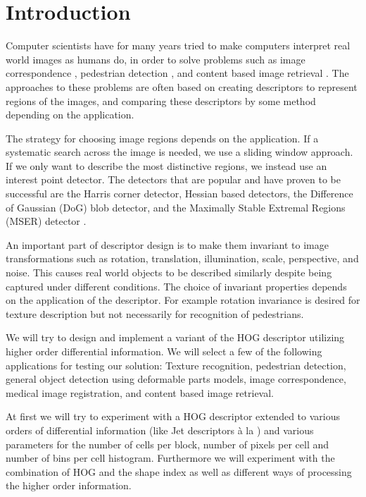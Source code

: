 \documentclass[thesis.tex]{subfiles}
\begin{document}
\section{Introduction}
\label{sec:introduction}

Computer scientists have for many years tried to make computers interpret real world images as humans do, in order to solve problems such as image correspondence \cite{dahl2011finding}, pedestrian detection \cite{felzenszwalb2008discriminatively}, and content based image retrieval \cite{smeulders2000content}. The approaches to these problems are often based on creating descriptors to represent regions of the images, and comparing these descriptors by some method depending on the application. 

The strategy for choosing image regions depends on the application. If a systematic search across the image is needed, we use a sliding window approach. If we only want to describe the most distinctive regions, we instead use an interest point detector. The detectors that are popular and have proven to be successful are the Harris corner detector, Hessian based detectors, the Difference of Gaussian (DoG) blob detector, and the Maximally Stable Extremal Regions (MSER) detector \cite{aanaes2012interesting,dahl2011finding}.

An important part of descriptor design is to make them invariant to image transformations such as rotation, translation, illumination, scale, perspective, and noise. This causes real world objects to be described similarly despite being captured under different conditions. The choice of invariant properties depends on the application of the descriptor. For example rotation invariance is desired for texture description but not necessarily for recognition of pedestrians.

We will try to design and implement a variant of the HOG descriptor utilizing higher order differential information. We will select a few of the following applications for testing our solution: Texture recognition, pedestrian detection, general object detection using deformable parts models, image correspondence, medical image registration, and content based image retrieval.

At first we will try to experiment with a HOG descriptor extended to various orders of differential information (like Jet descriptors à la \cite{larsen2012jet}) and various parameters for the number of cells per block, number of pixels per cell and number of bins per cell histogram. Furthermore we will experiment with the combination of HOG and the shape index \cite{koenderink1992surface} as well as different ways of processing the higher order information.
\end{document}

